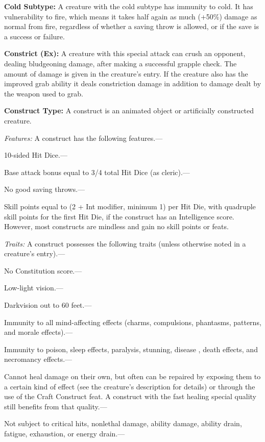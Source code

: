 \documentclass{article}
\begin{document}
\vspace{12pt}
\textbf{Cold Subtype: }A creature with the cold subtype has immunity to cold. It 
has vulnerability to fire, which means it takes half again as much (+50\%) damage 
as normal from fire, regardless of whether a saving throw is allowed, or if the 
save is a success or failure. 

\vspace{12pt}
\textbf{Constrict (Ex):} A creature with this special attack can crush an opponent, 
dealing bludgeoning damage, after making a successful grapple check. The amount 
of damage is given in the creature's entry. If the creature also has the improved 
grab ability it deals constriction damage in addition to damage dealt by the weapon 
used to grab.

\vspace{12pt}
\textbf{Construct Type: }A construct is an animated object or artificially constructed 
creature.

\textit{Features: }A construct has the following features.---

10-sided Hit Dice.---

Base attack bonus equal to 3/4 total Hit Dice (as cleric).---

No good saving throws.---

Skill points equal to (2 + Int modifier, minimum 1) per Hit Die, with quadruple 
skill points for the first Hit Die, if the construct has an Intelligence score. 
However, most constructs are mindless and gain no skill points or feats.

\textit{Traits: }A construct possesses the following traits (unless otherwise noted 
in a creature's entry).---

No Constitution score.---

Low-light vision.---

Darkvision out to 60 feet.---

Immunity to all mind-affecting effects (charms, compulsions, phantasms, patterns, 
and morale effects).---

Immunity to poison, sleep effects, paralysis, stunning, disease , death effects, 
and necromancy effects.---

Cannot heal damage on their own, but often can be repaired by exposing them to 
a certain kind of effect (see the creature's description for details) or through 
the use of the Craft Construct feat. A construct with the fast healing special 
quality still benefits from that quality.---

Not subject to critical hits, nonlethal damage, ability damage, ability drain, 
fatigue, exhaustion, or energy drain.---
\end{document}
